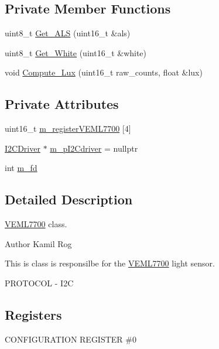 \subsection*{Private Member Functions}
\begin{DoxyCompactItemize}
\item 
uint8\+\_\+t \hyperlink{classVEML7700_a6a5e3bcbf41bc103823ca4d9f26ce31f}{Get\+\_\+\+A\+LS} (uint16\+\_\+t \&als)
\item 
uint8\+\_\+t \hyperlink{classVEML7700_aaee2f4b39b9391548ccb96bcdaebe2a0}{Get\+\_\+\+White} (uint16\+\_\+t \&white)
\item 
void \hyperlink{classVEML7700_a1e7056289f5d716f0d120cc5798d664a}{Compute\+\_\+\+Lux} (uint16\+\_\+t raw\+\_\+counts, float \&lux)
\end{DoxyCompactItemize}
\subsection*{Private Attributes}
\begin{DoxyCompactItemize}
\item 
uint16\+\_\+t \hyperlink{classVEML7700_a8e5c194037bceb4544cc1a7b05f697bb}{m\+\_\+register\+V\+E\+M\+L7700} \mbox{[}4\mbox{]}
\item 
\hyperlink{classI2CDriver}{I2\+C\+Driver} $\ast$ \hyperlink{classVEML7700_a06777141dab95a6244cc75e97a66f238}{m\+\_\+p\+I2\+Cdriver} = nullptr
\item 
int \hyperlink{classVEML7700_ae6d0418ab65f7fdfb21079d8637334af}{m\+\_\+fd}
\end{DoxyCompactItemize}


\subsection{Detailed Description}
\hyperlink{classVEML7700}{V\+E\+M\+L7700} class. 

\begin{DoxyAuthor}{Author}
Kamil Rog
\end{DoxyAuthor}
This is class is responsilbe for the \hyperlink{classVEML7700}{V\+E\+M\+L7700} light sensor.

P\+R\+O\+T\+O\+C\+OL -\/ I2C\hypertarget{classVEML7700_VEML7700}{}\subsection{Registers}\label{classVEML7700_VEML7700}
C\+O\+N\+F\+I\+G\+U\+R\+A\+T\+I\+ON R\+E\+G\+I\+S\+T\+ER \#0


